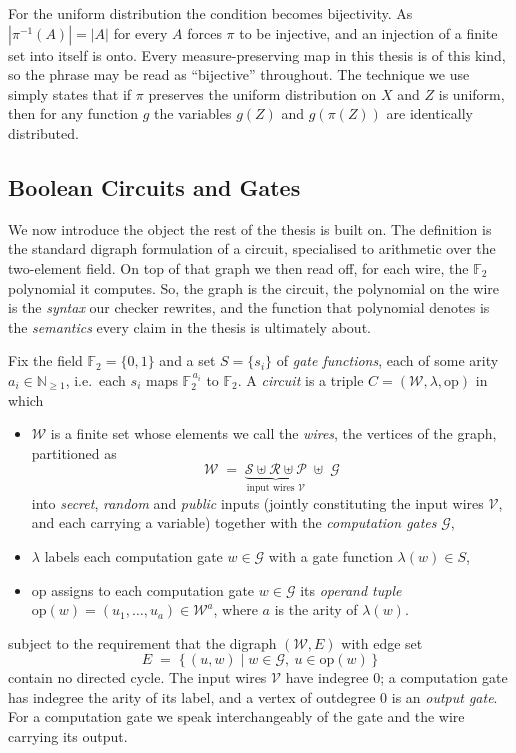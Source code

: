  For the uniform distribution the condition becomes bijectivity. As $|\pi^{-1}(A)| = |A|$
  for every $A$ forces $\pi$ to be injective, and an injection of a finite set into
  itself is onto. Every measure-preserving map in this thesis is of this kind, so
  the phrase may be read as ``bijective'' throughout. The technique we use
  simply states that if $\pi$ preserves the uniform distribution on $X$ and $Z$ is
  uniform, then for any function $g$ the variables $g(Z)$ and $g(\pi(Z))$ are
  identically distributed.

  \subsection{Boolean Circuits and Gates}
  \label{sec:bool-circuits}

We now introduce the object the rest of the thesis is built on.
The definition is the standard digraph formulation of a circuit, specialised to
arithmetic over the two-element field. On top of that graph we then read off, for
each wire, the $\mathbb{F}_2$ polynomial it computes. So, the graph is the circuit,
the polynomial on the wire is the
\emph{syntax} our checker rewrites, and the function that polynomial denotes is
the \emph{semantics} every claim in the thesis is ultimately about.

\begin{definition}
\label{def:circuit}
Fix the field $\mathbb{F}_2 = \{0,1\}$ and a set $S = \{s_i\}$ of \emph{gate
functions}, each of some arity $a_i \in \mathbb{N}_{\geq 1}$, i.e.\ each $s_i$
maps $\mathbb{F}_2^{\,a_i}$ to $\mathbb{F}_2$. A \emph{circuit} is a triple
$C = (\mathcal{W}, \lambda, \mathrm{op})$ in which
\begin{itemize}
  \item $\mathcal{W}$ is a finite set whose elements we call the \emph{wires},
  the vertices of the graph, partitioned as
  \[
    \mathcal{W} \;=\;
      \underbrace{\mathcal{S} \uplus \mathcal{R} \uplus \mathcal{P}}_{\text{input wires } \mathcal{V}}
      \;\uplus\; \mathcal{G}
  \]
  into \emph{secret}, \emph{random} and \emph{public} inputs (jointly constituting the
  input wires $\mathcal{V}$, and each carrying a variable) together with the
  \emph{computation gates} $\mathcal{G}$,
  \item $\lambda$ labels each computation gate $w \in \mathcal{G}$ with a gate function
  $\lambda(w) \in S$,
  \item $\mathrm{op}$ assigns to each computation gate $w \in \mathcal{G}$ its \emph{operand
  tuple} $\mathrm{op}(w) = (u_1, \dots, u_a) \in \mathcal{W}^{a}$, where $a$ is
  the arity of $\lambda(w)$.
\end{itemize}
subject to the requirement that the digraph $(\mathcal{W}, E)$ with edge set
\[
  E \;=\; \big\{\, (u, w) \mid w \in \mathcal{G}, \ u \in \mathrm{op}(w) \,\big\}
\]
contain no directed cycle. The input wires $\mathcal{V}$ have
indegree $0$; a computation gate has indegree the arity of its label, and a vertex of
outdegree $0$ is an \emph{output gate}. For a computation gate we speak
interchangeably of the gate and the wire carrying its output.
\end{definition}

